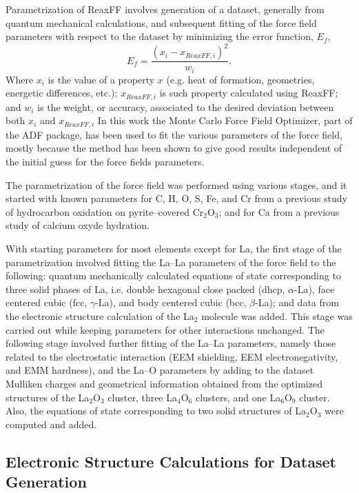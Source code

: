 \documentclass[journal=jpcafh,manuscript=article]{achemso}
\begin{document}
Parametrization of ReaxFF involves generation of a dataset, generally from quantum mechanical calculations, and subsequent fitting of the force field parameters with respect to the dataset by minimizing the error function, $E_f$,
\begin{equation}
E_f = \frac{(x_{i} - x_{ReaxFF,i})^2}{w_i}.
\end{equation}
Where $x_{i}$ is the value of a property $x$ (e.g. heat of formation, geometries, energetic differences, etc.); $x_{ReaxFF,i}$ is such property calculated using ReaxFF; and $w_i$ is the weight, or accuracy, associated to the desired deviation between both $x_i$ and $x_{ReaxFF,i}$
In this work the Monte Carlo Force Field Optimizer,\cite{iype_parameterization_2013} part of the ADF package, has been used to fit the various parameters of the force field, mostly because the method has been shown to give good results independent of the initial guess for the force fields parameters.

The parametrization of the force field was performed using various stages, and it started with known parameters for C, H, O, S, Fe, and Cr from a previous study of hydrocarbon oxidation on pyrite--covered Cr$_2$O$_3$; \cite{shin_development_2015} and for Ca from a previous study of calcium oxyde hydration. \cite{manzano_hydration_2012}

With starting parameters for most elements except for La, the first stage of the parametrization involved fitting the La--La parameters of the force field to the following: quantum mechanically calculated equations of state corresponding to three solid phases of La, i.e. double hexagonal close packed (dhcp, $\alpha$-La), face centered cubic (fcc, $\gamma$-La), and body centered cubic (bcc, $\beta$-La); and data from the electronic structure calculation of the La$_2$ molecule was added.
This stage was carried out while keeping parameters for other interactions unchanged.
The following stage involved further fitting of the La--La parameters, namely those related to the electrostatic interaction (EEM shielding, EEM electronegativity, and EMM hardness), and the La--O parameters by adding to the dataset Mulliken charges and geometrical information obtained from the optimized structures of the La$_2$O$_3$ cluster, three La$_4$O$_6$ clusters, and one La$_6$O$_9$ cluster.
Also, the equations of state corresponding to two solid structures of La$_2$O$_3$ were computed and added.


\subsection{Electronic Structure Calculations for Dataset Generation}
\end{document}
